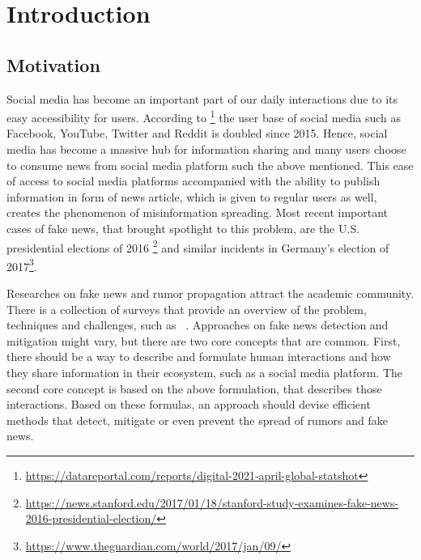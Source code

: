 \chapter{Introduction}
\label{ch:Introduction}


\section{Motivation}
\label{sec:Motivation}
Social media has become an important part of our daily interactions due to its easy accessibility for users. According to \footnote{\url{https://datareportal.com/reports/digital-2021-april-global-statshot}} the user base of social media such as Facebook, YouTube, Twitter and Reddit is doubled since 2015. Hence, social media has become a massive hub for information sharing and many users choose to consume news from social media platform such the above mentioned. This ease of access to social media platforms accompanied with the ability to publish information in form of news article, which is given to regular users as well, creates the phenomenon of misinformation spreading. Most recent important cases of fake news, that brought spotlight to this problem, are the U.S. presidential elections of 2016 \footnote{\url{https://news.stanford.edu/2017/01/18/stanford-study-examines-fake-news-2016-presidential-election/}} and similar incidents in Germany's election of 2017\footnote{\url{https://www.theguardian.com/world/2017/jan/09/}}. 

Researches on fake news and rumor propagation attract the academic community. There is a collection of surveys that provide an overview of the problem, techniques and challenges, such as ~\cite{Zubiaga_2018,sharma2019combating,TrueFalseNewsOnline}. Approaches on fake news detection and mitigation might vary, but there are two core concepts that are common. First, there should be a way to describe and formulate human interactions and how they share information in their ecosystem, such as a social media platform. The second core concept is based on the above formulation, that describes those interactions. Based on these formulas, an approach should devise efficient methods that detect, mitigate or even prevent the spread of rumors and fake news.

